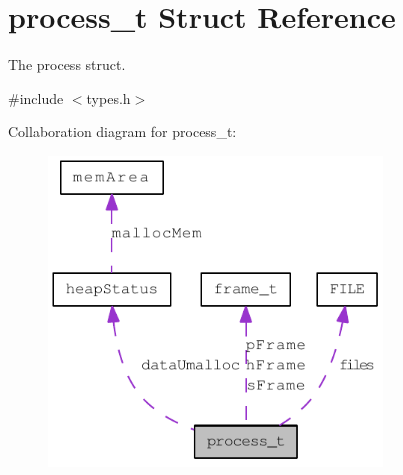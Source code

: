 \hypertarget{structprocess__t}{
\section{process\_\-t Struct Reference}
\label{structprocess__t}
}


The process struct.  




{\ttfamily \#include $<$types.h$>$}



Collaboration diagram for process\_\-t:\nopagebreak
\begin{figure}[H]
\begin{center}
\leavevmode
\includegraphics[width=251pt]{structprocess__t__coll__graph}
\end{center}
\end{figure}
